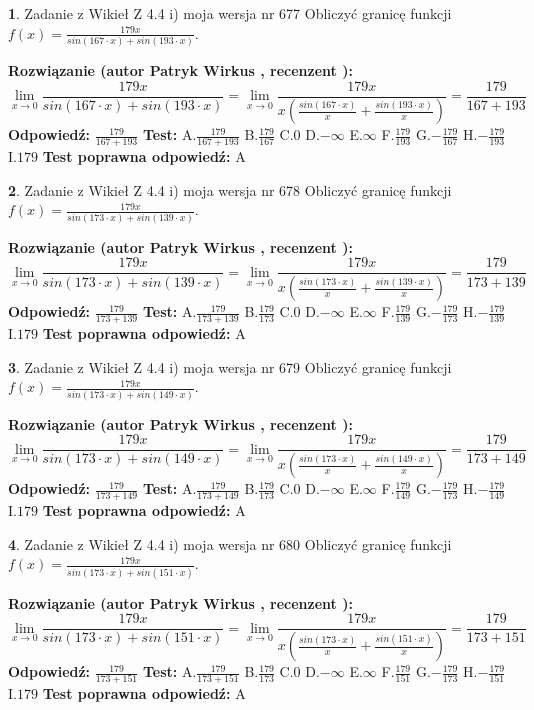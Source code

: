 \documentclass[12pt, a4paper]{article}
\theoremstyle{definition} %
\newtheorem{zad}{}
\newcommand{\zadStart}[1]{\begin{zad}#1\newline}
\newcommand{\zadStop}{\end{zad}}
\newcommand{\rozwStart}[2]{\noindent \textbf{Rozwiązanie (autor #1 , recenzent #2): }\newline}
\newcommand{\rozwStop}{\newline}
\newcommand{\odpStart}{\noindent \textbf{Odpowiedź:}\newline}
\newcommand{\odpStop}{\newline}
\newcommand{\testStart}{\noindent \textbf{Test:}\newline}
\newcommand{\testStop}{\newline}
\newcommand{\kluczStart}{\noindent \textbf{Test poprawna odpowiedź:}\newline}
\newcommand{\kluczStop}{\newline}
\begin{document}
\zadStart{Zadanie z Wikieł Z 4.4 i) moja wersja nr 677}
Obliczyć granicę funkcji $f(x)=\frac{179x}{sin(167\cdot x) +sin(193\cdot x)}$.
\zadStop
\rozwStart{Patryk Wirkus}{}
$$\lim\limits_{x\to 0}\frac{179x}{sin(167\cdot x) +sin(193\cdot x)}=\lim\limits_{x\to 0}\frac{179x}{x(\frac{sin(167\cdot x)}{x}+\frac{sin(193\cdot x)}{x})}=\frac{179}{167+193}$$
\rozwStop
\odpStart
$\frac{179}{167+193}$
\odpStop
\testStart
A.$\frac{179}{167+193}$
B.$\frac{179}{167}$
C.$0$
D.$-\infty$
E.$\infty$
F.$\frac{179}{193}$
G.$-\frac{179}{167}$
H.$-\frac{179}{193}$
I.$179$
\testStop
\kluczStart
A
\kluczStop



\zadStart{Zadanie z Wikieł Z 4.4 i) moja wersja nr 678}
Obliczyć granicę funkcji $f(x)=\frac{179x}{sin(173\cdot x) +sin(139\cdot x)}$.
\zadStop
\rozwStart{Patryk Wirkus}{}
$$\lim\limits_{x\to 0}\frac{179x}{sin(173\cdot x) +sin(139\cdot x)}=\lim\limits_{x\to 0}\frac{179x}{x(\frac{sin(173\cdot x)}{x}+\frac{sin(139\cdot x)}{x})}=\frac{179}{173+139}$$
\rozwStop
\odpStart
$\frac{179}{173+139}$
\odpStop
\testStart
A.$\frac{179}{173+139}$
B.$\frac{179}{173}$
C.$0$
D.$-\infty$
E.$\infty$
F.$\frac{179}{139}$
G.$-\frac{179}{173}$
H.$-\frac{179}{139}$
I.$179$
\testStop
\kluczStart
A
\kluczStop



\zadStart{Zadanie z Wikieł Z 4.4 i) moja wersja nr 679}
Obliczyć granicę funkcji $f(x)=\frac{179x}{sin(173\cdot x) +sin(149\cdot x)}$.
\zadStop
\rozwStart{Patryk Wirkus}{}
$$\lim\limits_{x\to 0}\frac{179x}{sin(173\cdot x) +sin(149\cdot x)}=\lim\limits_{x\to 0}\frac{179x}{x(\frac{sin(173\cdot x)}{x}+\frac{sin(149\cdot x)}{x})}=\frac{179}{173+149}$$
\rozwStop
\odpStart
$\frac{179}{173+149}$
\odpStop
\testStart
A.$\frac{179}{173+149}$
B.$\frac{179}{173}$
C.$0$
D.$-\infty$
E.$\infty$
F.$\frac{179}{149}$
G.$-\frac{179}{173}$
H.$-\frac{179}{149}$
I.$179$
\testStop
\kluczStart
A
\kluczStop



\zadStart{Zadanie z Wikieł Z 4.4 i) moja wersja nr 680}
Obliczyć granicę funkcji $f(x)=\frac{179x}{sin(173\cdot x) +sin(151\cdot x)}$.
\zadStop
\rozwStart{Patryk Wirkus}{}
$$\lim\limits_{x\to 0}\frac{179x}{sin(173\cdot x) +sin(151\cdot x)}=\lim\limits_{x\to 0}\frac{179x}{x(\frac{sin(173\cdot x)}{x}+\frac{sin(151\cdot x)}{x})}=\frac{179}{173+151}$$
\rozwStop
\odpStart
$\frac{179}{173+151}$
\odpStop
\testStart
A.$\frac{179}{173+151}$
B.$\frac{179}{173}$
C.$0$
D.$-\infty$
E.$\infty$
F.$\frac{179}{151}$
G.$-\frac{179}{173}$
H.$-\frac{179}{151}$
I.$179$
\testStop
\kluczStart
A
\kluczStop
\end{document}
